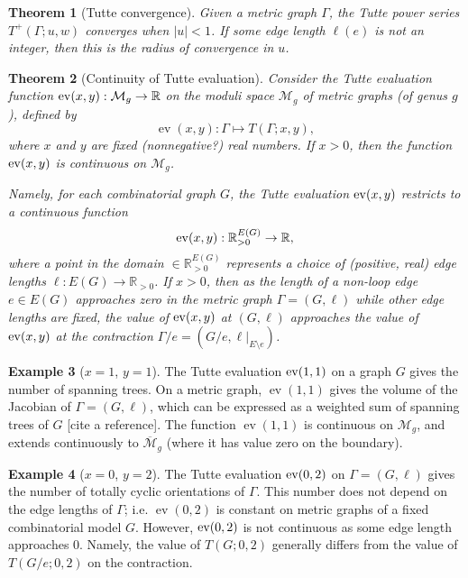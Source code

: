 \documentclass{amsart}
\newtheorem{thm}{Theorem}
\theoremstyle{definition}
\newtheorem{eg}[thm]{Example}
\newcommand{\RR}{\mathbb{R}}
\DeclareMathOperator{\ev}{ev}
\begin{document}
\begin{thm}[Tutte convergence]
Given a metric graph $\Gamma$,
the Tutte power series $T^+(\Gamma;u,w)$ converges when $|u|<1$.
If some edge length $\ell(e)$ is not an integer,
then this is the radius of convergence in $u$.
\end{thm}

\begin{thm}[Continuity of Tutte evaluation]
Consider the Tutte evaluation function %
${\rm ev}(x,y) : \mathcal M_g \to \RR$ 
on the moduli space 
$\mathcal M_g$ of metric graphs (of genus $g$),
defined by
$$ \ev(x,y) : \Gamma \mapsto T(\Gamma; x,y) ,$$
where  $x$ and $y$ are fixed (nonnegative?) real numbers.
If $x > 0$, 
then the function ${\rm ev}(x,y)$ is continuous on $\mathcal M_g$.

Namely, for each combinatorial graph $G$,
the Tutte evaluation 
${\rm ev}(x,y) $ 
restricts to a continuous function
$$ {\rm ev}(x,y) : \RR_{>0}^{E(G)} \to \RR,$$ 
where a point in the domain $ \in \RR_{>0}^{E(G)}$
represents a choice of (positive, real) edge lengths  $\ell : E(G) \to \RR_{>0}$.
If $x>0$, then as the length of a  non-loop edge $e \in E(G)$ approaches zero
in the metric graph $\Gamma = (G,\ell)$
while other edge lengths are fixed,
the value of 
${\rm ev}(x,y)$
at $(G,\ell)$ %
approaches the value of ${\rm ev}(x,y)$ at the contraction 
$\Gamma / e = (G / e, \ell \big|_{E\setminus e})$.
\end{thm}

\begin{eg}
[$x = 1$, $y=1$]
The Tutte evaluation ${\rm ev}(1,1)$ 
on a graph $G$ gives the number of spanning trees.
On a metric graph, $\ev(1,1)$ gives the volume of the Jacobian of
$\Gamma = (G,\ell)$,
which can be expressed as a weighted sum of spanning trees of $G$ [cite a reference].
The function $\ev(1,1)$ is continuous on $\mathcal M_g$, 
and extends continuously to $\overline{\mathcal M}_g$ 
(where it has value zero on the boundary).
\end{eg}
\begin{eg}
[$x = 0$, $y=2$]
The Tutte evaluation ${\rm ev}(0,2)$ 
on $\Gamma = (G,\ell)$ gives the number of totally cyclic orientations of $\Gamma$.
This number does not depend on the edge lengths of $\Gamma$;
i.e. $\ev(0,2)$
 is constant on metric graphs %
of a fixed combinatorial model $G$.
However, ${\rm ev}(0,2)$ is not continuous as some edge length approaches $0$.
Namely, the value of $T(G; 0, 2)$ generally differs from the value of $T(G/e; 0,2)$
on the contraction.
\end{eg}
\end{document}
